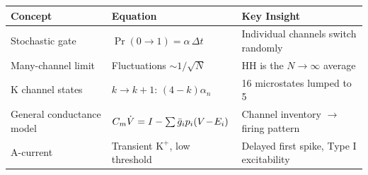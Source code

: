 \begin{chaptersummary}

\begin{center}
\renewcommand{\arraystretch}{1.6}
\begin{tabularx}{\textwidth}{@{}l X X@{}}
  \toprule
  \textbf{Concept} & \textbf{Equation} & \textbf{Key Insight} \\
  \midrule
  Stochastic gate &
  $\Pr(0\!\to\!1) = \alpha\,\Delta t$ &
  Individual channels switch randomly \\
  Many-channel limit &
  Fluctuations $\sim 1/\sqrt{N}$ &
  HH is the $N \to \infty$ average \\
  K channel states &
  $k \to k\!+\!1$: $(4\!-\!k)\alpha_n$ &
  16 microstates lumped to 5 \\
  General conductance model &
  $C_m\dot{V} = I - \sum \bar{g}_i p_i(V\!-\!E_i)$ &
  Channel inventory $\to$ firing pattern \\
  A-current &
  Transient $\text{K}^+$, low threshold &
  Delayed first spike, Type I excitability \\
  \bottomrule
\end{tabularx}
\end{center}

\end{chaptersummary}


